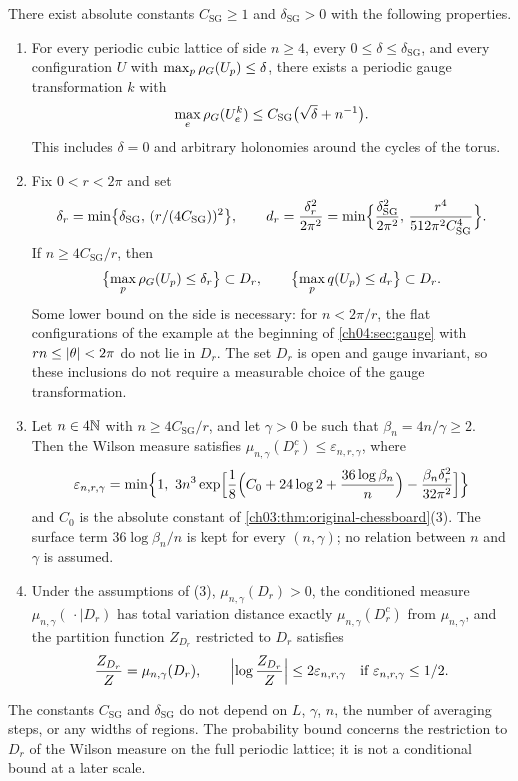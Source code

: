 \begin{theorem}\label{ch04:thm:small-curvature-admission}
There exist absolute constants $C_{\mathrm{SG}}\ge1$ and $\delta_{\mathrm{SG}}>0$ with the following properties.
\begin{enumerate}
\item For every periodic cubic lattice of side $n\ge4$, every $0\le\delta\le\delta_{\mathrm{SG}}$, and every configuration $U$ with $\max_p\rho_G(U_p)\le\delta$, there exists a periodic gauge transformation $k$ with
\[
 \max_e\rho_G(U^k_e)\le C_{\mathrm{SG}}\bigl(\sqrt\delta+n^{-1}\bigr).
\]
This includes $\delta=0$ and arbitrary holonomies around the cycles of the torus.
\item Fix $0<r<2\pi$ and set
\[
 \delta_r=\min\bigl\{\delta_{\mathrm{SG}},\,(r/(4C_{\mathrm{SG}}))^2\bigr\},\qquad d_r=\frac{\delta_r^2}{2\pi^2}=\min\Bigl\{\frac{\delta_{\mathrm{SG}}^2}{2\pi^2},\,\frac{r^4}{512\pi^2C_{\mathrm{SG}}^4}\Bigr\}.
\]
If $n\ge4C_{\mathrm{SG}}/r$, then
\[
 \bigl\{\max_p\rho_G(U_p)\le\delta_r\bigr\}\subset D_r,\qquad\bigl\{\max_pq(U_p)\le d_r\bigr\}\subset D_r.
\]
Some lower bound on the side is necessary: for $n<2\pi/r$, the flat configurations of the example at the beginning of \cref{ch04:sec:gauge} with $rn\le\lvert \theta\rvert<2\pi$ do not lie in $D_r$. The set $D_r$ is open and gauge invariant, so these inclusions do not require a measurable choice of the gauge transformation.
\item Let $n\in4\mathbb N$ with $n\ge4C_{\mathrm{SG}}/r$, and let $\gamma>0$ be such that $\beta_n=4n/\gamma\ge2$. Then the Wilson measure satisfies $\mu_{n,\gamma}(D_r^c)\le\varepsilon_{n,r,\gamma}$, where
\[
 \varepsilon_{n,r,\gamma}=\min\Bigl\{1,\ 3n^3\exp\Bigl[\frac18\Bigl(C_0+24\log2+\frac{36\log\beta_n}n\Bigr)-\frac{\beta_n\delta_r^2}{32\pi^2}\Bigr]\Bigr\}
\]
and $C_0$ is the absolute constant of \cref{ch03:thm:original-chessboard}(3). The surface term $36\log\beta_n/n$ is kept for every $(n,\gamma)$; no relation between $n$ and $\gamma$ is assumed.
\item Under the assumptions of (3), $\mu_{n,\gamma}(D_r)>0$, the conditioned measure $\mu_{n,\gamma}(\,\cdot\mid D_r)$ has total variation distance exactly $\mu_{n,\gamma}(D_r^c)$ from $\mu_{n,\gamma}$, and the partition function $Z_{D_r}$ restricted to $D_r$ satisfies
\[
 \frac{Z_{D_r}}Z=\mu_{n,\gamma}(D_r),\qquad\Bigl\lvert\log\frac{Z_{D_r}}Z\Bigr\rvert\le2\varepsilon_{n,r,\gamma}\quad\text{if }\varepsilon_{n,r,\gamma}\le1/2.
\]
\end{enumerate}
The constants $C_{\mathrm{SG}}$ and $\delta_{\mathrm{SG}}$ do not depend on $L$, $\gamma$, $n$, the number of averaging steps, or any widths of regions. The probability bound concerns the restriction to $D_r$ of the Wilson measure on the full periodic lattice; it is not a conditional bound at a later scale.
\end{theorem}

